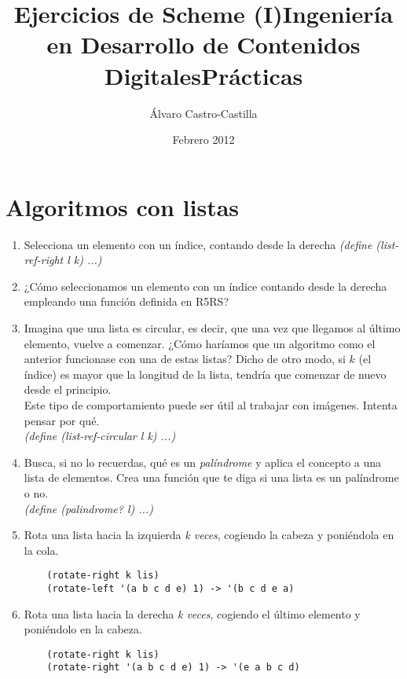 \documentclass[11pt]{article}
\title{Ejercicios de Scheme (I)\linebreak Ingeniería en Desarrollo de Contenidos Digitales\linebreak Prácticas}
\author{Álvaro Castro-Castilla}
\date{Febrero 2012}
\begin{document}
\maketitle


\section{Algoritmos con listas}
\begin{enumerate}
  \item Selecciona un elemento con un índice, contando desde la derecha
    \newline \textit{(define (list-ref-right l k) ...)}

  \item ¿Cómo seleccionamos un elemento con un índice contando desde la derecha empleando una función definida en R5RS?

  \item Imagina que una lista es circular, es decir, que una vez que llegamos al último elemento, vuelve a comenzar. ¿Cómo haríamos que un algoritmo como el anterior funcionase con una de estas listas? Dicho de otro modo, si $k$ (el índice) es mayor que la longitud de la lista, tendría que comenzar de nuevo desde el principio.
    \\[3mm]
    Este tipo de comportamiento puede ser útil al trabajar con imágenes. Intenta pensar por qué.
    \\[3mm]
    \textit{(define (list-ref-circular l k) ...)}

  \item Busca, si no lo recuerdas, qué es un \textit{palíndrome} y aplica el concepto a una lista de elementos. Crea una función que te diga si una lista es un palíndrome o no.
    \\[3mm]
    \textit{(define (palindrome? l) ...)}

  \item Rota una lista hacia la izquierda \textit{k veces}, cogiendo la cabeza y poniéndola en la cola.
\begin{verbatim}
    (rotate-right k lis)
    (rotate-left '(a b c d e) 1) -> '(b c d e a)
\end{verbatim}

  \item Rota una lista hacia la derecha \textit{k veces}, cogiendo el último elemento y poniéndolo en la cabeza.
\begin{verbatim}
    (rotate-right k lis)
    (rotate-right '(a b c d e) 1) -> '(e a b c d)
\end{verbatim}


\end{enumerate}
\end{document}
